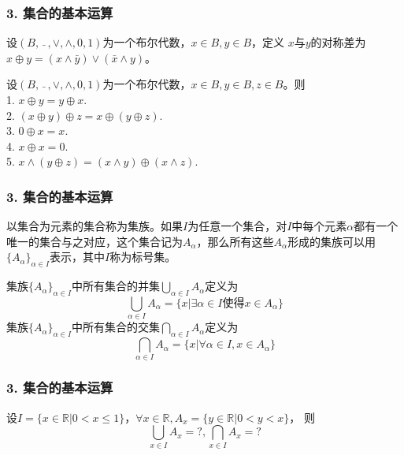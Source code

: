 \documentclass{beamer}
\begin{document}
\begin{CJK*}{UTF8}{gbsn}
\begin{frame}
  \frametitle{3. 集合的基本运算}
  \begin{Def}
    设$(B, \ \bar{}\ , \lor, \land, 0, 1)$为一个布尔代数，$x \in B, y \in B$，定义 $x$与$y$的\alert{对称差}为
    $x \oplus y = (x \land \bar{y}) \lor (\bar{x} \land y)$。
  \end{Def}
  \begin{Thm}
    设$(B, \ \bar{}\ , \lor, \land, 0, 1)$为一个布尔代数，$x \in B, y \in B, z \in B$。则\\
1. $x \oplus y = y \oplus x$.\\
2. $(x \oplus y) \oplus z = x \oplus (y \oplus z)$.\\
3. $0 \oplus x = x$.\\
4. $x \oplus x = 0$.\\
5. $x \land (y \oplus z) = (x \land y) \oplus (x \land z)$.\\ 
  \end{Thm}
\end{frame}

\begin{frame}
  \frametitle{3. 集合的基本运算}
  \begin{Def}
    以集合为元素的集合称为\alert{集族}。如果$I$为任意一个集合，对$I$中每个元素$\alpha$都有一个唯一的集合与之对应，这个集合记为$A_{\alpha}$，那么所有这些$A_{\alpha}$形成的集族可以用$\{A_{\alpha}\}_{\alpha \in I}$表示，其中$I$称为\alert{标号集}。
  \end{Def}
  \begin{Def}
    集族$\{A_{\alpha}\}_{\alpha \in I}$中所有集合的并集$\bigcup_{\alpha \in I}A_{\alpha}$定义为
\[ \bigcup_{\alpha \in I}A_{\alpha} = \{x|\exists \alpha \in I \text{使得} x \in A_{\alpha}\}\]
    集族$\{A_{\alpha}\}_{\alpha \in I}$中所有集合的交集$\bigcap_{\alpha \in I}A_{\alpha}$定义为
\[ \bigcap_{\alpha \in I}A_{\alpha} = \{x|\forall \alpha \in I, x \in A_{\alpha}\}\]
  \end{Def}
\end{frame}

\begin{frame}
  \frametitle{3. 集合的基本运算}
  \begin{Ex}
    设$I=\{x \in \mathbb{R} | 0 < x \leq 1\}$，$\forall x \in \mathbb{R}, A_x=\{y\in \mathbb{R}|0 < y < x\}$，
    则
    \begin{equation*}
      \bigcup_{x\in I}A_x=?,
      \bigcap_{x\in I}A_x=?      
    \end{equation*}
  \end{Ex}
\end{frame}


\end{CJK*}
\end{document}
